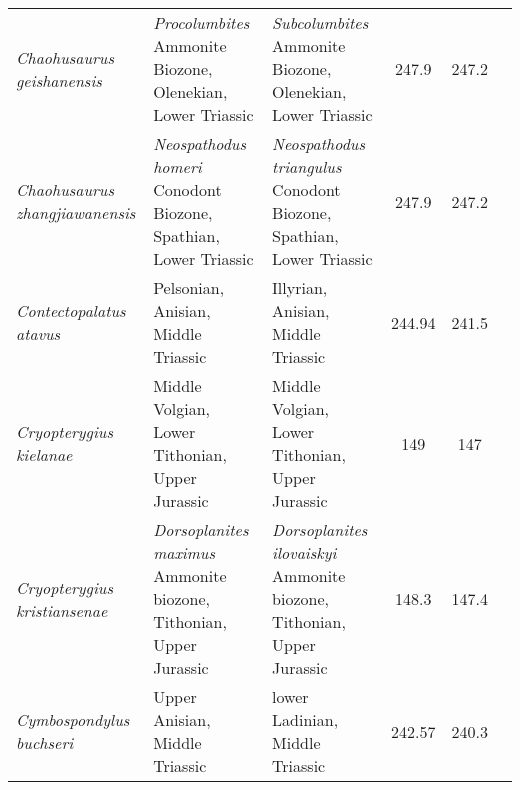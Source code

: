 \begin{longtabu}{>{\itshape}lXXSSl}
	Chaohusaurus geishanensis                            & \emph{Procolumbites} Ammonite Biozone, Olenekian, Lower Triassic                                                                   & \emph{Subcolumbites} Ammonite Biozone, Olenekian, Lower Triassic                                                                   & 247.9                    & 247.2                    & \cite{Motani2014a,Motani2015} \\         
	Chaohusaurus zhangjiawanensis                        & \emph{Neospathodus homeri} Conodont Biozone, Spathian, Lower Triassic                                                              & \emph{Neospathodus triangulus} Conodont Biozone, Spathian, Lower Triassic                                                          & 247.9                    & 247.2                    & \cite{Chen2013} \\                       
	Contectopalatus atavus                               & Pelsonian, Anisian, Middle Triassic                                                                                                & Illyrian, Anisian, Middle Triassic                                                                                                 & 244.94                   & 241.5                    & \cite{Liu2013} \\                        
	Cryopterygius kielanae                               & Middle Volgian, Lower Tithonian, Upper Jurassic                                                                                    & Middle Volgian, Lower Tithonian, Upper Jurassic                                                                                    & 149                      & 147                      & \cite{Tyborowski2016} \\                 
	Cryopterygius kristiansenae                          & \emph{Dorsoplanites maximus} Ammonite biozone, Tithonian, Upper Jurassic                                                           & \emph{Dorsoplanites ilovaiskyi} Ammonite biozone, Tithonian, Upper Jurassic                                                        & 148.3                    & 147.4                    & \cite{Druckenmiller2012a} \\             
	Cymbospondylus buchseri                              & Upper Anisian, Middle Triassic                                                                                                     & lower Ladinian, Middle Triassic                                                                                                    & 242.57                   & 240.3                    & \cite{Sander1989} \\                     

\end{longtabu}
